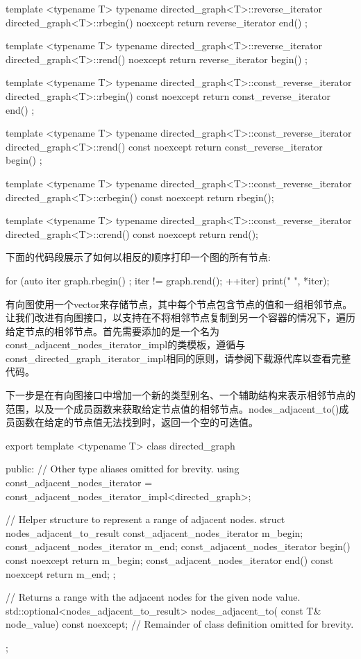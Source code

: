 \begin{cpp}
template <typename T>
typename directed_graph<T>::reverse_iterator
    directed_graph<T>::rbegin() noexcept { return reverse_iterator { end() }; }

template <typename T>
typename directed_graph<T>::reverse_iterator
    directed_graph<T>::rend() noexcept { return reverse_iterator { begin() }; }

template <typename T>
typename directed_graph<T>::const_reverse_iterator
    directed_graph<T>::rbegin() const noexcept
{ return const_reverse_iterator { end() }; }

template <typename T>
typename directed_graph<T>::const_reverse_iterator
    directed_graph<T>::rend() const noexcept
{ return const_reverse_iterator { begin() }; }

template <typename T>
typename directed_graph<T>::const_reverse_iterator
    directed_graph<T>::crbegin() const noexcept { return rbegin(); }

template <typename T>
typename directed_graph<T>::const_reverse_iterator
    directed_graph<T>::crend() const noexcept { return rend(); }
\end{cpp}

下面的代码段展示了如何以相反的顺序打印一个图的所有节点:

\begin{cpp}
for (auto iter { graph.rbegin() }; iter != graph.rend(); ++iter) {
    print("{} ", *iter);
}
\end{cpp}


有向图使用一个vector来存储节点，其中每个节点包含节点的值和一组相邻节点。让我们改进有向图接口，以支持在不将相邻节点复制到另一个容器的情况下，遍历给定节点的相邻节点。首先需要添加的是一个名为const\_adjacent\_nodes\_iterator\_impl的类模板，遵循与const\_directed\_graph\_iterator\_impl相同的原则，请参阅下载源代库以查看完整代码。

下一步是在有向图接口中增加一个新的类型别名、一个辅助结构来表示相邻节点的范围，以及一个成员函数来获取给定节点值的相邻节点。nodes\_adjacent\_to()成员函数在给定的节点值无法找到时，返回一个空的可选值。

\begin{cpp}
export template <typename T>
class directed_graph
{
    public:
        // Other type aliases omitted for brevity.
        using const_adjacent_nodes_iterator =
            const_adjacent_nodes_iterator_impl<directed_graph>;

        // Helper structure to represent a range of adjacent nodes.
        struct nodes_adjacent_to_result
        {
            const_adjacent_nodes_iterator m_begin;
            const_adjacent_nodes_iterator m_end;
            const_adjacent_nodes_iterator begin() const noexcept{ return m_begin; }
            const_adjacent_nodes_iterator end() const noexcept { return m_end; }
        };

        // Returns a range with the adjacent nodes for the given node value.
        std::optional<nodes_adjacent_to_result> nodes_adjacent_to(
            const T& node_value) const noexcept;
        // Remainder of class definition omitted for brevity.
};
\end{cpp}

